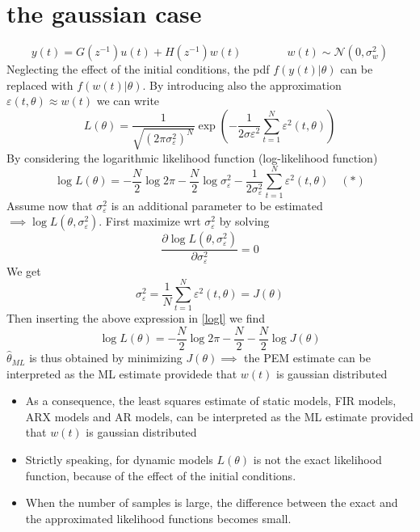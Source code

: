 \documentclass{book}
\theoremstyle{definition}
\theoremstyle{remark}
\theoremstyle{remark}
\begin{document}
\section{the gaussian case}
\[
    y(t) = G(z^{-1})u(t) + H(z^{-1})w(t) \qquad\qquad  w(t) \sim \mathcal{N}(0,\sigma_w^2)
\]
Neglecting the effect of the initial conditions, the pdf $f(y(t)|\theta)$ can be replaced with $f(w(t)|\theta)$. By introducing also the approximation $\varepsilon(t,\theta)\approx w(t)$ we can write 
\[
    L(\theta)=\displaystyle\frac{1}{\sqrt{(2\pi\sigma_\varepsilon^2)^N}}\exp\left(-\displaystyle\frac{1}{2\sigma\varepsilon^2}\displaystyle\sum_{t=1}^{N}\varepsilon^2(t,\theta)\right)
\]
By considering the logarithmic likelihood function (log-likelihood function)
\begin{equation}
    \log L(\theta) = -\displaystyle\frac{N}{2}\log 2\pi -\displaystyle\frac{N}{2}\log \sigma_\varepsilon^2-\displaystyle\frac{1}{2\sigma_\varepsilon^2}\displaystyle\sum_{t=1}^{N}\varepsilon^2(t,\theta) \quad (*)\label{logl}
\end{equation}
Assume now that $\sigma_\varepsilon^2$ is an additional parameter to be estimated $\implies \log L(\theta,\sigma_\varepsilon^2)$. First maximize wrt $\sigma_\varepsilon^2$ by solving 
\[
    \displaystyle\frac{\partial \log L(\theta,\sigma_\varepsilon^2)}{\partial \sigma_\varepsilon^2}=0
\]
We get 
\[
    \sigma_\varepsilon^2=\displaystyle\frac{1}{N}\displaystyle\sum_{t=1}^{N}\varepsilon^2(t,\theta)=J(\theta)
\]
Then inserting the above expression in \ref{logl} we find 
\[
    \log L(\theta) = -\displaystyle\frac{N}{2}\log 2\pi -\displaystyle\frac{N}{2}-\displaystyle\frac{N}{2}\log J(\theta)
\]
$\hat{\theta}_{ML}$ is thus obtained by minimizing $J(\theta)\implies$ the PEM estimate can be interpreted as the ML estimate providede that $w(t)$ is gaussian distributed 
\begin{itemize}
    \item As a consequence, the least squares estimate of static models, FIR models, ARX models and AR models, can be interpreted as the ML estimate provided that $w(t)$ is gaussian distributed
    \item Strictly speaking, for dynamic models $L(\theta)$ is not the exact likelihood function, because of the effect of the initial conditions. 
    \item When the number of samples is large, the difference between the exact and the approximated likelihood functions becomes small.
\end{itemize}
\end{document}
